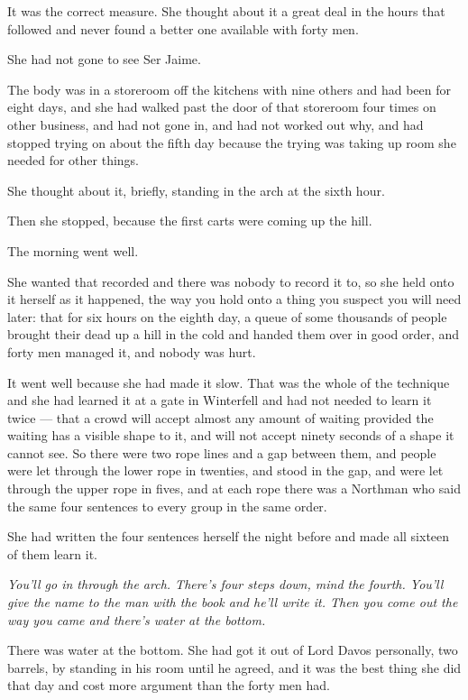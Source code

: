 It was the correct measure. She thought about it a great deal in the hours that followed and never found a better one available with forty men.

\sceneBreak

She had not gone to see Ser Jaime.

The body was in a storeroom off the kitchens with nine others and had been for eight days, and she had walked past the door of that storeroom four times on other business, and had not gone in, and had not worked out why, and had stopped trying on about the fifth day because the trying was taking up room she needed for other things.

She thought about it, briefly, standing in the arch at the sixth hour.

Then she stopped, because the first carts were coming up the hill.

\sceneBreak

The morning went well.

She wanted that recorded and there was nobody to record it to, so she held onto it herself as it happened, the way you hold onto a thing you suspect you will need later: that for six hours on the eighth day, a queue of some thousands of people brought their dead up a hill in the cold and handed them over in good order, and forty men managed it, and nobody was hurt.

It went well because she had made it slow. That was the whole of the technique and she had learned it at a gate in Winterfell and had not needed to learn it twice — that a crowd will accept almost any amount of waiting provided the waiting has a visible shape to it, and will not accept ninety seconds of a shape it cannot see. So there were two rope lines and a gap between them, and people were let through the lower rope in twenties, and stood in the gap, and were let through the upper rope in fives, and at each rope there was a Northman who said the same four sentences to every group in the same order.

She had written the four sentences herself the night before and made all sixteen of them learn it.

\textit{You’ll go in through the arch. There’s four steps down, mind the fourth. You’ll give the name to the man with the book and he’ll write it. Then you come out the way you came and there’s water at the bottom.}

There was water at the bottom. She had got it out of Lord Davos personally, two barrels, by standing in his room until he agreed, and it was the best thing she did that day and cost more argument than the forty men had.

